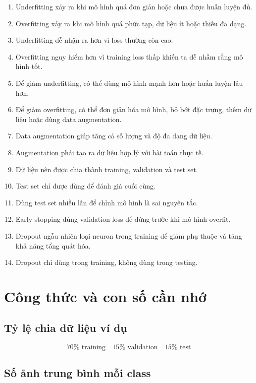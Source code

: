 \documentclass[12pt,a4paper]{report}
\begin{document}
\begin{enumerate}
    \item Underfitting xảy ra khi mô hình quá đơn giản hoặc chưa được huấn luyện đủ.
    \item Overfitting xảy ra khi mô hình quá phức tạp, dữ liệu ít hoặc thiếu đa dạng.
    \item Underfitting dễ nhận ra hơn vì loss thường còn cao.
    \item Overfitting nguy hiểm hơn vì training loss thấp khiến ta dễ nhầm rằng mô hình tốt.
    \item Để giảm underfitting, có thể dùng mô hình mạnh hơn hoặc huấn luyện lâu hơn.
    \item Để giảm overfitting, có thể đơn giản hóa mô hình, bỏ bớt đặc trưng, thêm dữ liệu hoặc dùng data augmentation.
    \item Data augmentation giúp tăng cả số lượng và độ đa dạng dữ liệu.
    \item Augmentation phải tạo ra dữ liệu hợp lý với bài toán thực tế.
    \item Dữ liệu nên được chia thành training, validation và test set.
    \item Test set chỉ được dùng để đánh giá cuối cùng.
    \item Dùng test set nhiều lần để chỉnh mô hình là sai nguyên tắc.
    \item Early stopping dùng validation loss để dừng trước khi mô hình overfit.
    \item Dropout ngẫu nhiên loại neuron trong training để giảm phụ thuộc và tăng khả năng tổng quát hóa.
    \item Dropout chỉ dùng trong training, không dùng trong testing.
\end{enumerate}

\section{Công thức và con số cần nhớ}

\subsection*{Tỷ lệ chia dữ liệu ví dụ}

\[
    70\% \text{ training}
    \quad
    15\% \text{ validation}
    \quad
    15\% \text{ test}
\]

\subsection*{Số ảnh trung bình mỗi class}
\end{document}
